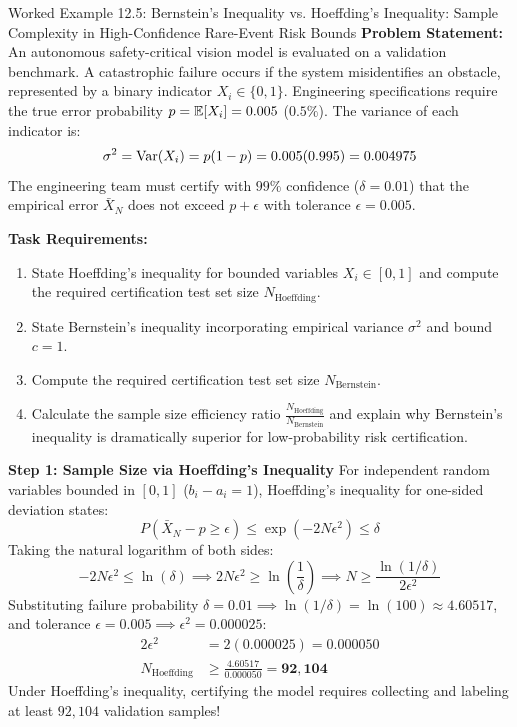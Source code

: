 \begin{examplebox}[breakable]{Worked Example 12.5: Bernstein's Inequality vs. Hoeffding's Inequality: Sample Complexity in High-Confidence Rare-Event Risk Bounds}
\textbf{Problem Statement:}
An autonomous safety-critical vision model is evaluated on a validation benchmark. A catastrophic failure occurs if the system misidentifies an obstacle, represented by a binary indicator $X_i \in \{0, 1\}$.
Engineering specifications require the true error probability $p = \operatorname{\mathbb{E}}[X_i] = 0.005$ ($0.5\%$). The variance of each indicator is:
\begin{equation}
\sigma^2 = \operatorname{Var}(X_i) = p(1 - p) = 0.005(0.995) = 0.004975
\end{equation}
The engineering team must certify with $99\%$ confidence ($\delta = 0.01$) that the empirical error $\bar{X}_N$ does not exceed $p + \epsilon$ with tolerance $\epsilon = 0.005$.

\textbf{Task Requirements:}
\begin{enumerate}
    \item State Hoeffding's inequality for bounded variables $X_i \in [0, 1]$ and compute the required certification test set size $N_{\text{Hoeffding}}$.
    \item State Bernstein's inequality incorporating empirical variance $\sigma^2$ and bound $c = 1$.
    \item Compute the required certification test set size $N_{\text{Bernstein}}$.
    \item Calculate the sample size efficiency ratio $\frac{N_{\text{Hoeffding}}}{N_{\text{Bernstein}}}$ and explain why Bernstein's inequality is dramatically superior for low-probability risk certification.
\end{enumerate}

\tcblower

\textbf{Step 1: Sample Size via Hoeffding's Inequality}
For independent random variables bounded in $[0, 1]$ ($b_i - a_i = 1$), Hoeffding's inequality for one-sided deviation states:
\begin{equation}
P\left( \bar{X}_N - p \ge \epsilon \right) \le \exp\left( -2 N \epsilon^2 \right) \le \delta
\end{equation}
Taking the natural logarithm of both sides:
\begin{equation}
-2 N \epsilon^2 \le \ln(\delta) \implies 2 N \epsilon^2 \ge \ln\left(\frac{1}{\delta}\right) \implies N \ge \frac{\ln(1/\delta)}{2\epsilon^2}
\end{equation}
Substituting failure probability $\delta = 0.01 \implies \ln(1/\delta) = \ln(100) \approx 4.60517$, and tolerance $\epsilon = 0.005 \implies \epsilon^2 = 0.000025$:
\begin{align}
2\epsilon^2 &= 2(0.000025) = 0.000050 \\
N_{\text{Hoeffding}} &\ge \frac{4.60517}{0.000050} = \mathbf{92{,}104}
\end{align}
Under Hoeffding's inequality, certifying the model requires collecting and labeling at least $92{,}104$ validation samples!


\end{examplebox}
